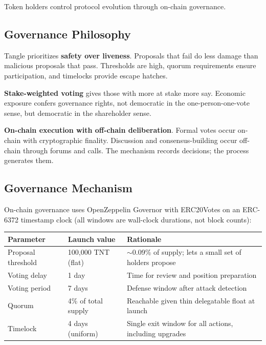 \documentclass[11pt,a4paper]{article}
\begin{document}
Token holders control protocol evolution through on-chain governance.

\subsection{Governance Philosophy}

Tangle prioritizes \textbf{safety over liveness}. Proposals that fail do less damage than malicious proposals that pass. Thresholds are high, quorum requirements ensure participation, and timelocks provide escape hatches.

\textbf{Stake-weighted voting} gives those with more at stake more say. Economic exposure confers governance rights, not democratic in the one-person-one-vote sense, but democratic in the shareholder sense.

\textbf{On-chain execution with off-chain deliberation}. Formal votes occur on-chain with cryptographic finality. Discussion and consensus-building occur off-chain through forums and calls. The mechanism records decisions; the process generates them.

\subsection{Governance Mechanism}

On-chain governance uses OpenZeppelin Governor with ERC20Votes on an ERC-6372 timestamp clock (all windows are wall-clock durations, not block counts):

\begin{center}
\begin{tabular}{lll}
\toprule
Parameter & Launch value & Rationale \\
\midrule
Proposal threshold & 100{,}000 TNT (flat) & $\sim$0.09\% of supply; lets a small set of holders propose \\
Voting delay & 1 day & Time for review and position preparation \\
Voting period & 7 days & Defense window after attack detection \\
Quorum & 4\% of total supply & Reachable given thin delegatable float at launch \\
Timelock & 4 days (uniform) & Single exit window for all actions, including upgrades \\
\bottomrule
\end{tabular}
\end{center}
\end{document}
